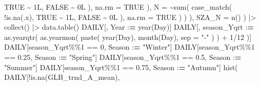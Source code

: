 \documentclass[
  10pt,
  a4paper,oneside]{article}
\newenvironment{Shaded}{\begin{snugshade}}{\end{snugshade}}
\newcommand{\AttributeTok}[1]{\textcolor[rgb]{0.77,0.63,0.00}{#1}}
\newcommand{\ConstantTok}[1]{\textcolor[rgb]{0.00,0.00,0.00}{#1}}
\newcommand{\DecValTok}[1]{\textcolor[rgb]{0.00,0.00,0.81}{#1}}
\newcommand{\ErrorTok}[1]{\textcolor[rgb]{0.64,0.00,0.00}{\textbf{#1}}}
\newcommand{\FloatTok}[1]{\textcolor[rgb]{0.00,0.00,0.81}{#1}}
\newcommand{\FunctionTok}[1]{\textcolor[rgb]{0.00,0.00,0.00}{#1}}
\newcommand{\NormalTok}[1]{#1}
\newcommand{\SpecialCharTok}[1]{\textcolor[rgb]{0.00,0.00,0.00}{#1}}
\newcommand{\StringTok}[1]{\textcolor[rgb]{0.31,0.60,0.02}{#1}}
\begin{document}
\begin{Shaded}
\begin{Highlighting}[]
                      \ConstantTok{TRUE} \SpecialCharTok{\textasciitilde{}}\NormalTok{ 1L, }\ConstantTok{FALSE} \SpecialCharTok{\textasciitilde{}}\NormalTok{ 0L}
\NormalTok{                  ),}
                    \AttributeTok{na.rm =} \ConstantTok{TRUE}
\NormalTok{                ),}
                  \AttributeTok{N =} \SpecialCharTok{\textasciitilde{}}\FunctionTok{sum}\NormalTok{(}
                    \FunctionTok{case\_match}\NormalTok{(}
                      \SpecialCharTok{!}\FunctionTok{is.na}\NormalTok{(.x),}
                      \ConstantTok{TRUE} \SpecialCharTok{\textasciitilde{}}\NormalTok{ 1L, }\ConstantTok{FALSE} \SpecialCharTok{\textasciitilde{}}\NormalTok{ 0L}
\NormalTok{                  ),}
                    \AttributeTok{na.rm =} \ConstantTok{TRUE}
\NormalTok{                )}
\NormalTok{              )}
\NormalTok{            ),}
            \AttributeTok{SZA\_N =} \FunctionTok{n}\NormalTok{()}
\NormalTok{        ) }\SpecialCharTok{|\textgreater{}}
        \FunctionTok{collect}\NormalTok{() }\SpecialCharTok{|\textgreater{}}
        \FunctionTok{data.table}\NormalTok{()}
\NormalTok{    DAILY[, Year }\SpecialCharTok{:}\ErrorTok{=} \FunctionTok{year}\NormalTok{(Day)]}
\NormalTok{    DAILY[, season\_Yqrt }\SpecialCharTok{:}\ErrorTok{=} \FunctionTok{as.yearqtr}\NormalTok{(}
        \FunctionTok{as.yearmon}\NormalTok{(}
            \FunctionTok{paste}\NormalTok{(}
                \FunctionTok{year}\NormalTok{(Day),}
                \FunctionTok{month}\NormalTok{(Day),}
                \AttributeTok{sep =} \StringTok{"{-}"}
\NormalTok{            )}
\NormalTok{        ) }\SpecialCharTok{+}
            \DecValTok{1}\SpecialCharTok{/}\DecValTok{12}
\NormalTok{    )]}
\NormalTok{    DAILY[season\_Yqrt}\SpecialCharTok{\%\%}\DecValTok{1} \SpecialCharTok{==} \DecValTok{0}\NormalTok{, Season }\SpecialCharTok{:}\ErrorTok{=} \StringTok{"Winter"}\NormalTok{]}
\NormalTok{    DAILY[season\_Yqrt}\SpecialCharTok{\%\%}\DecValTok{1} \SpecialCharTok{==} \FloatTok{0.25}\NormalTok{, Season }\SpecialCharTok{:}\ErrorTok{=} \StringTok{"Spring"}\NormalTok{]}
\NormalTok{    DAILY[season\_Yqrt}\SpecialCharTok{\%\%}\DecValTok{1} \SpecialCharTok{==} \FloatTok{0.5}\NormalTok{, Season }\SpecialCharTok{:}\ErrorTok{=} \StringTok{"Summer"}\NormalTok{]}
\NormalTok{    DAILY[season\_Yqrt}\SpecialCharTok{\%\%}\DecValTok{1} \SpecialCharTok{==} \FloatTok{0.75}\NormalTok{, Season }\SpecialCharTok{:}\ErrorTok{=} \StringTok{"Autumn"}\NormalTok{]}
    \FunctionTok{hist}\NormalTok{(}
\NormalTok{        DAILY[}\SpecialCharTok{!}\FunctionTok{is.na}\NormalTok{(GLB\_trnd\_A\_mean),}

\end{Highlighting}
\end{Shaded}
\end{document}
